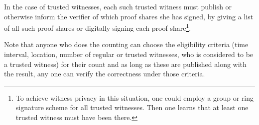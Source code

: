 
In the case of trusted witnesses, each such trusted witness must
publish or otherwise inform the 
verifier of which proof shares she has signed, \eg by giving a list 
of all such proof shares or digitally signing each proof share\footnote{
 To achieve witness privacy in this situation, one could employ a group or 
 ring signature scheme for all trusted witnesses.
 Then one learns that at least one trusted witness must have been there.
}.

Note that anyone who does the counting can choose the eligibility
criteria (time interval, location, number of regular or trusted
witnesses, who is considered to be a trusted witness) for their count
and as long as these are published along with the result, any one can
verify the correctness under those criteria.

